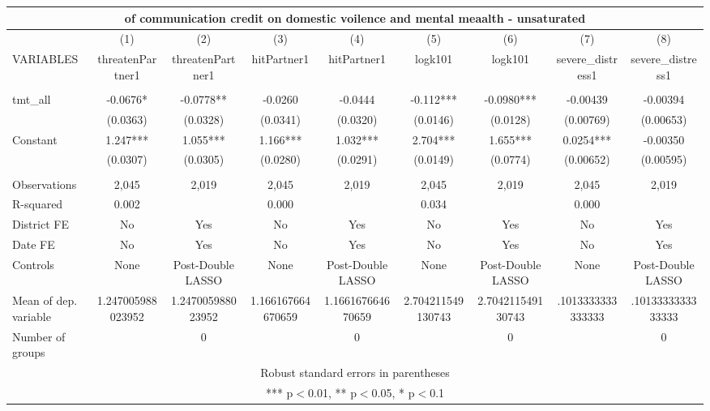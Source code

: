 \documentclass[]{article}
\begin{document}
\begin{tabular}{lcccccccc}
\multicolumn{9}{c}{of communication credit on domestic voilence and mental meaalth - unsaturated} \\ \hline
 & (1) & (2) & (3) & (4) & (5) & (6) & (7) & (8) \\
VARIABLES & threatenPartner1 & threatenPartner1 & hitPartner1 & hitPartner1 & logk101 & logk101 & severe\_distress1 & severe\_distress1 \\ \hline
 &  &  &  &  &  &  &  &  \\
tmt\_all & -0.0676* & -0.0778** & -0.0260 & -0.0444 & -0.112*** & -0.0980*** & -0.00439 & -0.00394 \\
 & (0.0363) & (0.0328) & (0.0341) & (0.0320) & (0.0146) & (0.0128) & (0.00769) & (0.00653) \\
Constant & 1.247*** & 1.055*** & 1.166*** & 1.032*** & 2.704*** & 1.655*** & 0.0254*** & -0.00350 \\
 & (0.0307) & (0.0305) & (0.0280) & (0.0291) & (0.0149) & (0.0774) & (0.00652) & (0.00595) \\
 &  &  &  &  &  &  &  &  \\
Observations & 2,045 & 2,019 & 2,045 & 2,019 & 2,045 & 2,019 & 2,045 & 2,019 \\
R-squared & 0.002 &  & 0.000 &  & 0.034 &  & 0.000 &  \\
District FE & No & Yes & No & Yes & No & Yes & No & Yes \\
Date FE & No & Yes & No & Yes & No & Yes & No & Yes \\
Controls & None & Post-Double LASSO & None & Post-Double LASSO & None & Post-Double LASSO & None & Post-Double LASSO \\
Mean of dep. variable & 1.247005988023952 & 1.247005988023952 & 1.166167664670659 & 1.166167664670659 & 2.704211549130743 & 2.704211549130743 & .1013333333333333 & .1013333333333333 \\
 Number of groups &  & 0 &  & 0 &  & 0 &  & 0 \\ \hline
\multicolumn{9}{c}{ Robust standard errors in parentheses} \\
\multicolumn{9}{c}{ *** p$<$0.01, ** p$<$0.05, * p$<$0.1} \\
\end{tabular}
\end{document}
